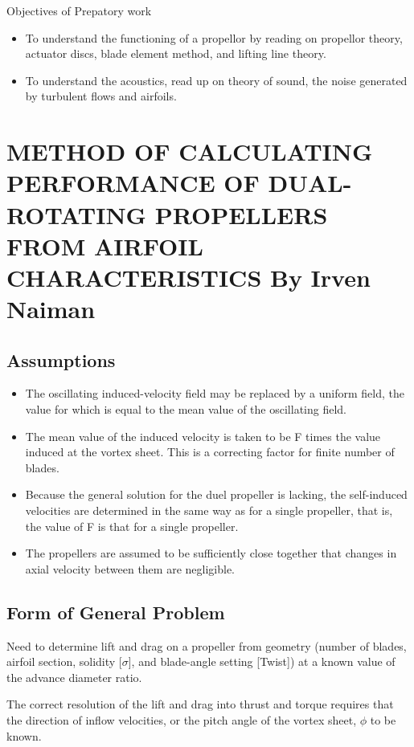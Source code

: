 \documentclass{article}
\begin{document}
Objectives of Prepatory work
\begin{itemize}
    \item To understand the functioning of a propellor by reading on propellor theory, actuator discs, blade element method, and lifting line theory.
    \item To understand the acoustics, read up on theory of sound, the noise generated by turbulent flows and airfoils.
\end{itemize}


\section{METHOD OF CALCULATING PERFORMANCE OF DUAL-ROTATING PROPELLERS FROM AIRFOIL CHARACTERISTICS By Irven Naiman}

\subsection{Assumptions}

\begin{itemize}
    \item The oscillating induced-velocity field may be replaced by a uniform field, the value for which is equal to the mean value of the oscillating field.
    \item The mean value of the induced velocity is taken to be F times the value induced at the vortex sheet. This is a correcting factor for finite number of blades.
    \item Because the general solution for the duel propeller is lacking, the self-induced velocities are determined in the same way as for a single propeller, that is, the value of F is that for a single propeller.
    \item The propellers are assumed to be sufficiently close together that changes in axial velocity between them are negligible.
\end{itemize}

\subsection{Form of General Problem}

Need to determine lift and drag on a propeller from geometry (number of blades, airfoil section, solidity [$\sigma$], and blade-angle setting [Twist]) at a known value of the advance diameter ratio.

The correct resolution of the lift and drag into thrust and torque requires that the direction of inflow velocities, or the pitch angle of the vortex sheet, $\phi$ to be known.
\end{document}
